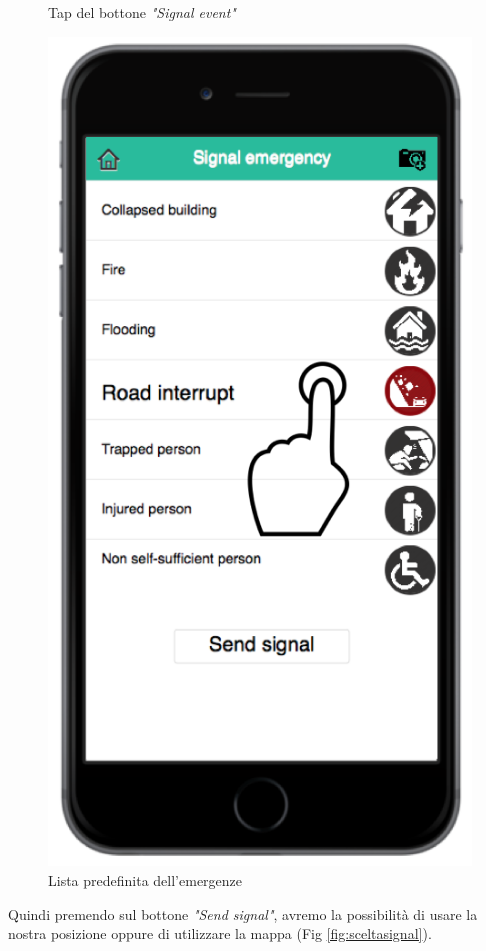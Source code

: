 \begin{itemize}
\begin{figure}[H]
	\caption{Tap del bottone \textit{"Signal event"}}
	\label{fig:buttonsegnala}
\end{figure}
   \begin{figure}[H]
	\centering
	\includegraphics[scale=1]{interfaccia/segnalatap.png}
	\caption{Lista predefinita dell'emergenze}
	\label{fig:lista-em}
\end{figure}
Quindi premendo sul bottone \textit{"Send signal"}, avremo la possibilità di usare la nostra posizione oppure di utilizzare la mappa (Fig \ref{fig:sceltasignal}).

\end{itemize}
